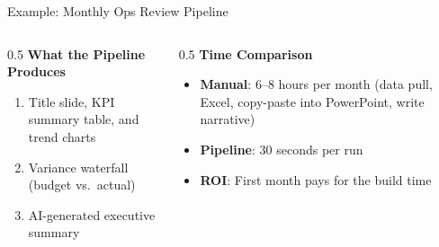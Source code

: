 \documentclass[aspectratio=169]{beamer}
\begin{document}
\begin{frame}{Example: Monthly Ops Review Pipeline}
\begin{columns}[T]
\begin{column}{0.5\textwidth}
\textbf{What the Pipeline Produces}
\begin{enumerate}\small
  \item Title slide, KPI summary table, and trend charts
  \item Variance waterfall (budget vs.\ actual)
  \item AI-generated executive summary
\end{enumerate}
\end{column}
\begin{column}{0.5\textwidth}
\textbf{Time Comparison}
\begin{itemize}\small
  \item \textbf{Manual}: 6--8 hours per month (data pull, Excel, copy-paste into PowerPoint, write narrative)
  \item \textbf{Pipeline}: \alert{30 seconds} per run
  \item \textbf{ROI}: First month pays for the build time
\end{itemize}
\end{column}
\end{columns}
\end{frame}
\end{document}
